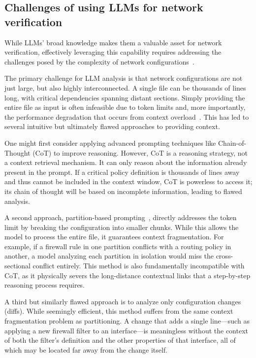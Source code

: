 \subsection{Challenges of using LLMs for network verification}
\label{sec:background:context}
\label{sec:motivation:challenges}


While LLMs' broad knowledge makes them a valuable asset
for network verification, effectively leveraging this
capability requires addressing the challenges posed by the complexity of network configurations~\cite{benson2009complexitymetrics, benson2011evolution, feamster2005detecting,maltz2004routing}.


The primary challenge for LLM analysis is that network configurations are not just large, but also highly interconnected. A single file can be thousands of lines long, with critical dependencies spanning distant sections. Simply providing the entire file as input is often infeasible due to token limits and, more importantly, the performance degradation that occurs from context overload~\cite{levy2024same}. This has led to several intuitive but ultimately flawed approaches to providing context.


One might first consider applying advanced prompting techniques like Chain-of-Thought (CoT) to improve reasoning. However, CoT is a reasoning strategy, not a context retrieval mechanism. It can only reason about the information already present in the prompt. If a critical policy definition is thousands of lines away and thus cannot be included in the context window, CoT is powerless to access it; its chain of thought will be based on incomplete information, leading to flawed analysis.



A second approach, partition-based prompting~\cite{lian2023configuration}, directly addresses the token limit by breaking the configuration into smaller chunks. While this allows the model to process the entire file, it guarantees context fragmentation. For example, if a firewall rule in one partition conflicts with a routing policy in another, a model analyzing each partition in isolation would miss the cross-sectional conflict entirely. This method is also fundamentally incompatible with CoT, as it physically severs the long-distance contextual links that a step-by-step reasoning process requires.


A third but similarly flawed approach is to analyze only configuration changes (diffs). While seemingly efficient, this method suffers from the same context fragmentation problem as partitioning. A change that adds a single line---such as applying a new firewall filter to an interface---is meaningless without the context of both the filter's definition and the other properties of that interface, all of which may be located far away from the change itself.



